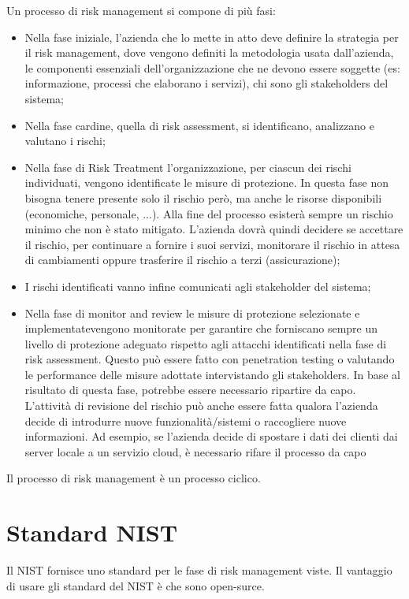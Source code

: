 \noindent Un processo di risk management si compone di più fasi:
\begin{itemize}
    \item Nella fase iniziale, l'azienda che lo mette in atto deve definire la strategia per il risk management, dove vengono definiti la metodologia usata dall'azienda, le componenti essenziali dell'organizzazione che ne devono essere soggette (es: informazione, processi che elaborano i servizi), chi sono gli stakeholders del sistema;
    \item Nella fase cardine, quella di risk assessment, si identificano, analizzano e valutano i rischi;
    \item Nella fase di Risk Treatment l'organizzazione, per ciascun dei rischi individuati, vengono identificate le misure di protezione. In questa fase non bisogna tenere presente solo il rischio però, ma anche le risorse disponibili (economiche, personale, ...). Alla fine del processo esisterà sempre un rischio minimo che non è stato mitigato. L'azienda dovrà quindi decidere se accettare il rischio, per continuare a fornire i suoi servizi, monitorare il rischio in attesa di cambiamenti oppure trasferire il rischio a terzi (assicurazione);
    \item I rischi identificati vanno infine comunicati agli stakeholder del sistema;
    \item Nella fase di monitor and review le misure di protezione selezionate e implementatevengono monitorate per garantire che forniscano sempre un livello di protezione adeguato rispetto agli attacchi identificati nella fase di risk assessment. Questo può essere fatto con penetration testing o valutando le performance delle misure adottate intervistando gli stakeholders. In base al risultato di questa fase, potrebbe essere necessario ripartire da capo. L'attività di revisione del rischio può anche essere fatta qualora l'azienda decide di introdurre nuove funzionalità/sistemi o raccogliere nuove informazioni. Ad esempio, se l'azienda decide di spostare i dati dei clienti dai server locale a un servizio cloud, è necessario rifare il processo da capo
\end{itemize}

\noindent Il processo di risk management è un processo ciclico.

\section{Standard NIST}

Il NIST fornisce uno standard per le fase di risk management viste. Il vantaggio di usare gli standard del NIST è che sono open-surce.

